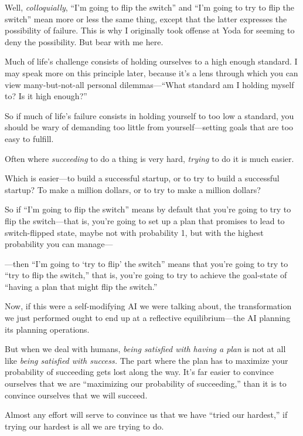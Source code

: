 {
 Well, \textit{colloquially},
``I'm going to flip the
switch'' and ``I'm
going to try to flip the switch'' mean more or less
the same thing, except that the latter expresses the possibility of
failure. This is why I originally took offense at Yoda for seeming to
deny the possibility. But bear with me here.}

{
 Much of life's challenge consists of holding
ourselves to a high enough standard. I may speak more on this principle
later, because it's a lens through which you can view
many-but-not-all personal dilemmas---``What standard
am I holding myself to? Is it high enough?''}

{
 So if much of life's failure consists in holding
yourself to too low a standard, you should be wary of demanding too
little from yourself---setting goals that are too easy to fulfill.}

{
 Often where \textit{succeeding} to do a thing is very hard,
\textit{trying} to do it is much easier.}

{
 Which is easier---to build a successful startup, or to try to
build a successful startup? To make a million dollars, or to try to
make a million dollars?}

{
 So if ``I'm going to flip the
switch'' means by default that you're
going to try to flip the switch---that is, you're going
to set up a plan that promises to lead to switch-flipped state, maybe
not with probability 1, but with the highest probability you can
manage---}

{
 {}---then ``I'm going to
`try to flip' the
switch'' means that you're going to
try to ``try to flip the switch,''
that is, you're going to try to achieve the goal-state
of ``having a plan that might flip the
switch.''}

{
 Now, if this were a self-modifying AI we were talking about, the
transformation we just performed ought to end up at a reflective
equilibrium---the AI planning its planning operations.}

{
 But when we deal with humans, \textit{being satisfied with having
a plan} is not at all like \textit{being satisfied with success.} The
part where the plan has to maximize your probability of succeeding gets
lost along the way. It's far easier to convince
ourselves that we are ``maximizing our probability of
succeeding,'' than it is to convince ourselves that
we will succeed.}

{
 Almost any effort will serve to convince us that we have
``tried our hardest,'' if trying our
hardest is all we are trying to do.}

